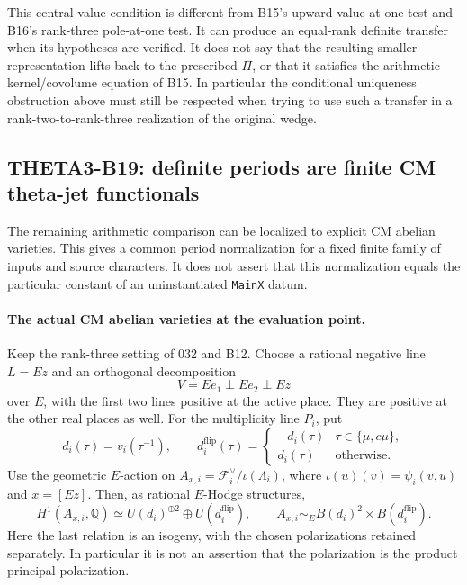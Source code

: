 \documentclass[11pt]{article}
\newcommand{\Q}{\mathbb Q}\newcommand{\C}{\mathbb C}\newcommand{\Z}{\mathbb Z}\newcommand{\R}{\mathbb R}\newcommand{\A}{\mathbb A}\newcommand{\OO}{\mathcal O}
\theoremstyle{definition}\newtheorem{definition}[theorem]{Definition}\newtheorem{remark}[theorem]{Remark}
\begin{document}
This central-value condition is different from B15's upward
value-at-one test and B16's rank-three pole-at-one test. It can
produce an equal-rank definite transfer when its hypotheses are
verified. It does not say that the resulting smaller
representation lifts back to the prescribed $\Pi$, or that it
satisfies the arithmetic kernel/covolume equation of B15.
In particular the conditional uniqueness obstruction above
must still be respected when trying to use such a transfer in
a rank-two-to-rank-three realization of the original wedge.


\subsection{THETA3-B19: definite periods are finite CM theta-jet functionals}\label{B19}

The remaining arithmetic comparison can be localized to explicit CM
abelian varieties.  This gives a common period normalization for a
fixed finite family of inputs and source characters.  It does not
assert that this normalization equals the particular constant of an
uninstantiated \texttt{MainX} datum.

\paragraph{The actual CM abelian varieties at the evaluation point.}
Keep the rank-three setting of 032 and B12.  Choose a rational
negative line $L=Ez$ and an orthogonal decomposition
\[
 V=Ee_1\perp Ee_2\perp Ez
\]
over $E$, with the first two lines positive at the active place.
They are positive at the other real places as well.  For the
multiplicity line $P_i$, put
\[
 d_i(\tau)=v_i(\tau^{-1}),\qquad
 d_i^{\mathrm{flip}}(\tau)=
 \begin{cases}-d_i(\tau)&\tau\in\{\mu,c\mu\},\\
 d_i(\tau)&\text{otherwise}.
 \end{cases}
\]
Use the geometric $E$-action on
$A_{x,i}=\mathcal F_i^\vee/\iota(\Lambda_i)$, where
$\iota(u)(v)=\psi_i(v,u)$ and $x=[Ez]$.
Then, as rational $E$-Hodge structures,
\begin{equation}\label{B19-CM}
 H^1(A_{x,i},\Q)
 \simeq U(d_i)^{\oplus2}\oplus U(d_i^{\mathrm{flip}}),
 \qquad
 A_{x,i}\sim_E B(d_i)^2\times B(d_i^{\mathrm{flip}}).
 \tag{B19a}
\end{equation}
Here the last relation is an isogeny, with the chosen polarizations
retained separately.  In particular it is not an assertion that the
polarization is the product principal polarization.
\end{document}
